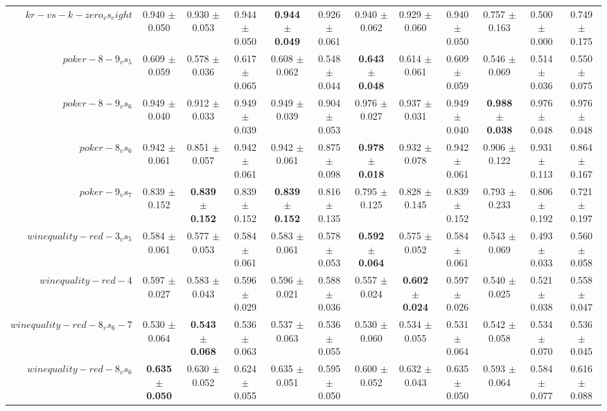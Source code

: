 \begin{table}[!ht]
{\begin{tabular}{r c c c c c c c c c c c}
$kr-vs-k-zero_vs_eight$ & 0.940 $\pm$ 0.050 & 0.930 $\pm$ 0.053 & 0.944 $\pm$ 0.050 & \textbf{0.944 $\pm$ 0.049} & 0.926 $\pm$ 0.061 & 0.940 $\pm$ 0.062 & 0.929 $\pm$ 0.060 & 0.940 $\pm$ 0.050 & 0.757 $\pm$ 0.163 & 0.500 $\pm$ 0.000 & 0.749 $\pm$ 0.175 \\
$poker-8-9_vs_5$ & 0.609 $\pm$ 0.059 & 0.578 $\pm$ 0.036 & 0.617 $\pm$ 0.065 & 0.608 $\pm$ 0.062 & 0.548 $\pm$ 0.044 & \textbf{0.643 $\pm$ 0.048} & 0.614 $\pm$ 0.061 & 0.609 $\pm$ 0.059 & 0.546 $\pm$ 0.069 & 0.514 $\pm$ 0.036 & 0.550 $\pm$ 0.075 \\
$poker-8-9_vs_6$ & 0.949 $\pm$ 0.040 & 0.912 $\pm$ 0.033 & 0.949 $\pm$ 0.039 & 0.949 $\pm$ 0.039 & 0.904 $\pm$ 0.053 & 0.976 $\pm$ 0.027 & 0.937 $\pm$ 0.031 & 0.949 $\pm$ 0.040 & \textbf{0.988 $\pm$ 0.038} & 0.976 $\pm$ 0.048 & 0.976 $\pm$ 0.048 \\
$poker-8_vs_6$ & 0.942 $\pm$ 0.061 & 0.851 $\pm$ 0.057 & 0.942 $\pm$ 0.061 & 0.942 $\pm$ 0.061 & 0.875 $\pm$ 0.098 & \textbf{0.978 $\pm$ 0.018} & 0.932 $\pm$ 0.078 & 0.942 $\pm$ 0.061 & 0.906 $\pm$ 0.122 & 0.931 $\pm$ 0.113 & 0.864 $\pm$ 0.167 \\
$poker-9_vs_7$ & 0.839 $\pm$ 0.152 & \textbf{0.839 $\pm$ 0.152} & 0.839 $\pm$ 0.152 & \textbf{0.839 $\pm$ 0.152} & 0.816 $\pm$ 0.135 & 0.795 $\pm$ 0.125 & 0.828 $\pm$ 0.145 & 0.839 $\pm$ 0.152 & 0.793 $\pm$ 0.233 & 0.806 $\pm$ 0.192 & 0.721 $\pm$ 0.197 \\
$winequality-red-3_vs_5$ & 0.584 $\pm$ 0.061 & 0.577 $\pm$ 0.053 & 0.584 $\pm$ 0.061 & 0.583 $\pm$ 0.061 & 0.578 $\pm$ 0.053 & \textbf{0.592 $\pm$ 0.064} & 0.575 $\pm$ 0.052 & 0.584 $\pm$ 0.061 & 0.543 $\pm$ 0.069 & 0.493 $\pm$ 0.033 & 0.560 $\pm$ 0.058 \\
$winequality-red-4$ & 0.597 $\pm$ 0.027 & 0.583 $\pm$ 0.043 & 0.596 $\pm$ 0.029 & 0.596 $\pm$ 0.021 & 0.588 $\pm$ 0.036 & 0.557 $\pm$ 0.024 & \textbf{0.602 $\pm$ 0.024} & 0.597 $\pm$ 0.026 & 0.540 $\pm$ 0.025 & 0.521 $\pm$ 0.038 & 0.558 $\pm$ 0.047 \\
$winequality-red-8_vs_6-7$ & 0.530 $\pm$ 0.064 & \textbf{0.543 $\pm$ 0.068} & 0.536 $\pm$ 0.063 & 0.537 $\pm$ 0.063 & 0.536 $\pm$ 0.055 & 0.530 $\pm$ 0.060 & 0.534 $\pm$ 0.055 & 0.531 $\pm$ 0.064 & 0.542 $\pm$ 0.058 & 0.534 $\pm$ 0.070 & 0.536 $\pm$ 0.045 \\
$winequality-red-8_vs_6$ & \textbf{0.635 $\pm$ 0.050} & 0.630 $\pm$ 0.052 & 0.624 $\pm$ 0.055 & 0.635 $\pm$ 0.051 & 0.595 $\pm$ 0.050 & 0.600 $\pm$ 0.052 & 0.632 $\pm$ 0.043 & 0.635 $\pm$ 0.050 & 0.593 $\pm$ 0.064 & 0.584 $\pm$ 0.077 & 0.616 $\pm$ 0.088 \\

\end{tabular}}
\end{table}
